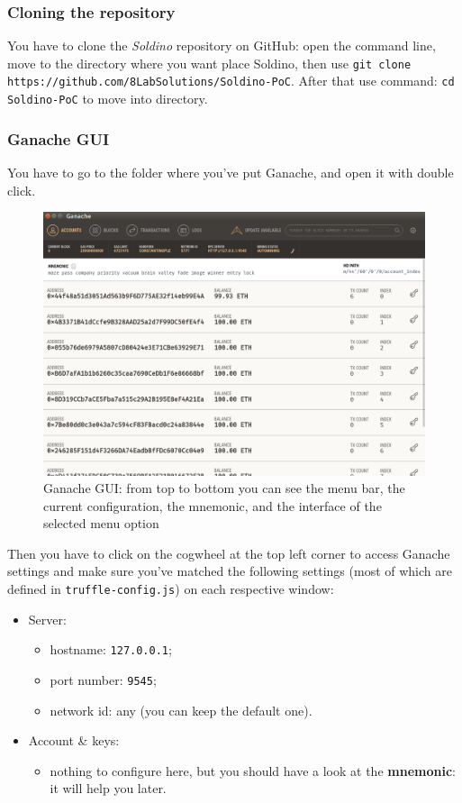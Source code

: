 \subsubsection{Cloning the repository}
You have to clone the \textit{Soldino} repository on GitHub: open the command line, move to the directory where you want place Soldino, then use \texttt{git clone https://github.com/8LabSolutions/Soldino-PoC}. After that use command: \texttt{cd Soldino-PoC} to move into directory.

\subsubsection{Ganache GUI}
You have to go to the folder where you've put Ganache, and open it with double click.
\begin{figure}
	\centering
	\includegraphics[scale=0.25]{res/images/ganache-ui.png}
	\caption{Ganache GUI: from top to bottom you can see the menu bar, the current configuration, the mnemonic, and the interface of the selected menu option}
\end{figure}
Then you have to click on the cogwheel at the top left corner to access Ganache settings and make sure you've matched the following settings (most of which are defined in \texttt{truffle-config.js}) on each respective window:
\begin{itemize}
	\item Server:
	\begin{itemize}
		\item hostname: \texttt{127.0.0.1};
		\item port number: \texttt{9545};
		\item network id: any (you can keep the default one).
	\end{itemize}
	\item Account \& keys\glo:
	\begin{itemize}
		\item nothing to configure here, but you should have a look at the \textbf{mnemonic}: it will help you later.
	\end{itemize}
\end{itemize}

